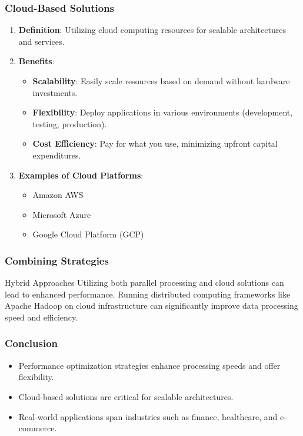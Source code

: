 \documentclass[aspectratio=169]{beamer}
\begin{document}
\begin{frame}[fragile]
    \frametitle{Cloud-Based Solutions}
    \begin{enumerate}
        \item \textbf{Definition}: Utilizing cloud computing resources for scalable architectures and services.
        \item \textbf{Benefits}:
        \begin{itemize}
            \item \textbf{Scalability}: Easily scale resources based on demand without hardware investments.
            \item \textbf{Flexibility}: Deploy applications in various environments (development, testing, production).
            \item \textbf{Cost Efficiency}: Pay for what you use, minimizing upfront capital expenditures.
        \end{itemize}
        \item \textbf{Examples of Cloud Platforms}:
        \begin{itemize}
            \item Amazon AWS
            \item Microsoft Azure
            \item Google Cloud Platform (GCP)
        \end{itemize}
    \end{enumerate}
\end{frame}

\begin{frame}[fragile]
    \frametitle{Combining Strategies}
    \begin{block}{Hybrid Approaches}
        Utilizing both parallel processing and cloud solutions can lead to enhanced performance. Running distributed computing frameworks like Apache Hadoop on cloud infrastructure can significantly improve data processing speed and efficiency.
    \end{block}
\end{frame}

\begin{frame}[fragile]
    \frametitle{Conclusion}
    \begin{itemize}
        \item Performance optimization strategies enhance processing speeds and offer flexibility.
        \item Cloud-based solutions are critical for scalable architectures.
        \item Real-world applications span industries such as finance, healthcare, and e-commerce.
    \end{itemize}
\end{frame}
\end{document}
